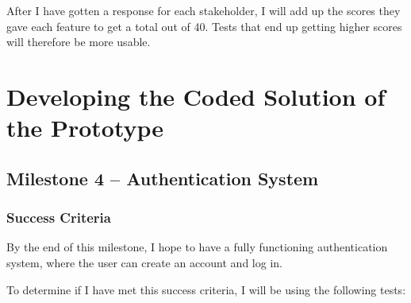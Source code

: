 \documentclass[12pt]{report}
\begin{document}
After I have gotten a response for each stakeholder, I will add up the scores they gave each feature to get a total out of 40. Tests that end up getting higher scores will therefore be more usable.

\chapter{Developing the Coded Solution of the  Prototype}
\section{Milestone 4 -- Authentication System}
\subsection{Success Criteria}
By the end of this milestone, I hope to have a fully functioning authentication system, where the user can create an account and log in. 
\begin{center}
\end{center}

To determine if I have met this success criteria, I will be using the following tests:

\begin{center}
\end{center}
\end{document}
